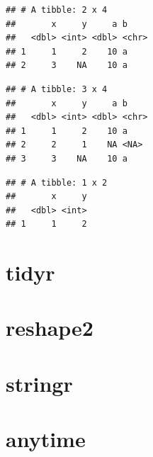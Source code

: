 \documentclass[]{book}
\newenvironment{Shaded}{\begin{snugshade}}{\end{snugshade}}
\newcommand{\CommentTok}[1]{\textcolor[rgb]{0.56,0.35,0.01}{\textit{#1}}}
\newcommand{\DataTypeTok}[1]{\textcolor[rgb]{0.13,0.29,0.53}{#1}}
\newcommand{\KeywordTok}[1]{\textcolor[rgb]{0.13,0.29,0.53}{\textbf{#1}}}
\newcommand{\NormalTok}[1]{#1}
\newcommand{\OperatorTok}[1]{\textcolor[rgb]{0.81,0.36,0.00}{\textbf{#1}}}
\newcommand{\StringTok}[1]{\textcolor[rgb]{0.31,0.60,0.02}{#1}}
\theoremstyle{definition}
\theoremstyle{definition}
\theoremstyle{definition}
\theoremstyle{remark}
\begin{document}
\begin{verbatim}
## # A tibble: 2 x 4
##       x     y     a b    
##   <dbl> <int> <dbl> <chr>
## 1     1     2    10 a    
## 2     3    NA    10 a
\end{verbatim}

\begin{Shaded}
\end{Shaded}

\begin{verbatim}
## # A tibble: 3 x 4
##       x     y     a b    
##   <dbl> <int> <dbl> <chr>
## 1     1     2    10 a    
## 2     2     1    NA <NA> 
## 3     3    NA    10 a
\end{verbatim}

\begin{Shaded}
\end{Shaded}

\begin{verbatim}
## # A tibble: 1 x 2
##       x     y
##   <dbl> <int>
## 1     1     2
\end{verbatim}

\hypertarget{tidyr}{%
\section{tidyr}\label{tidyr}}

\hypertarget{reshape2}{%
\section{reshape2}\label{reshape2}}

\hypertarget{stringr}{%
\section{stringr}\label{stringr}}

\hypertarget{anytime}{%
\section{anytime}\label{anytime}}
\end{document}
